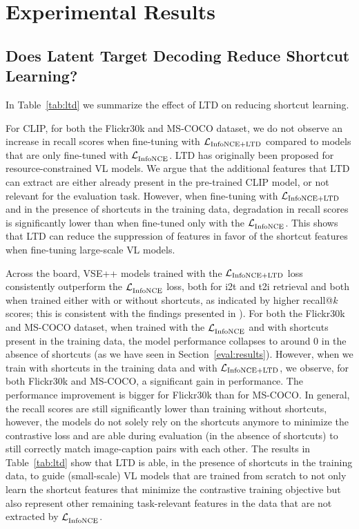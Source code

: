
\section{Experimental Results}
\label{sec:shorcut_results}

\subsection{Does Latent Target Decoding Reduce Shortcut Learning?}

In Table~\ref{tab:ltd} we summarize the effect of \ac{LTD} on reducing shortcut learning. 

For CLIP, for both the \ac{Flickr30k} and \ac{MS-COCO} dataset, we do not observe an increase in recall scores when fine-tuning with $\mathcal{L}_{\text{InfoNCE+LTD}}{}$ compared to models that are only fine-tuned with $\mathcal{L}_{\text{InfoNCE}}^{}$. 
LTD has originally been proposed for resource-constrained \ac{VL} models. 
We argue that the additional features that LTD can extract are either already present in the pre-trained CLIP model, or not relevant for the evaluation task. 
However, when fine-tuning with $\mathcal{L}_{\text{InfoNCE+LTD}}{}$ and in the presence of shortcuts in the training data, degradation in recall scores is significantly lower than when fine-tuned only with the $\mathcal{L}_{\text{InfoNCE}}^{}$. 
This shows that LTD can reduce the suppression of features in favor of the shortcut features when fine-tuning large-scale \ac{VL} models. 



Across the board, VSE++ models trained with the $\mathcal{L}_{\text{InfoNCE+LTD}}{}$ loss consistently outperform the $\mathcal{L}_{\text{InfoNCE}}^{}$ loss, both for \ac{i2t} and \ac{t2i} retrieval and both when trained either with or without shortcuts, as indicated by higher recall@$k$ scores; this is consistent with the findings presented in \citep{bleeker2023reducing}).
For both the \ac{Flickr30k} and \ac{MS-COCO} dataset, when trained with the $\mathcal{L}_{\text{InfoNCE}}^{}$ and with shortcuts present in the training data, the model performance collapses to around 0 in the absence of shortcuts (as we have seen in Section~\ref{eval:results}). 
However, when we train with shortcuts in the training data and with $\mathcal{L}_{\text{InfoNCE+LTD}}{}$, we observe, for both \ac{Flickr30k} and \ac{MS-COCO}, a significant gain in performance. 
The performance improvement is bigger for \ac{Flickr30k} than for \ac{MS-COCO}.
In general, the recall scores are still significantly lower than training without shortcuts, however, the models do not solely rely on the shortcuts anymore to minimize the contrastive loss and are able during evaluation (in the absence of shortcuts) to still correctly match image-caption pairs with each other.
The results in Table~\ref{tab:ltd} show that LTD is able, in the presence of shortcuts in the training data, to guide (small-scale) \ac{VL} models that are trained from scratch to not only learn the shortcut features that minimize the contrastive training objective but also represent other remaining task-relevant features in the data that are not extracted by $\mathcal{L}_{\text{InfoNCE}}^{}$.


